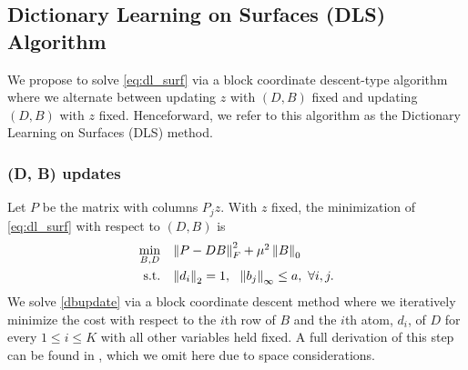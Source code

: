 \subsection{Dictionary Learning on Surfaces (DLS) Algorithm}
We propose to solve \eqref{eq:dl_surf} via a block coordinate descent-type algorithm where we alternate between updating $z$ with $(D,B)$ fixed and updating $(D,B)$ with $z$ fixed. Henceforward, we refer to this algorithm as the Dictionary Learning on Surfaces (DLS) method. 

\subsubsection{(D, B) updates}

Let $P$ be the matrix with columns $P_j z$. With $z$ fixed, the minimization of \eqref{eq:dl_surf} with respect to $(D,B)$ is
\begin{equation}  \label{dbupdate}
\begin{array}{rl}
\displaystyle\min_{B,D} & \left \| P - DB \right \|_F^2 +  \mu^2 \left \| B \right \|_0 \vspace{0.1cm} \\
\text{s.t.} & \left \| d_i \right \|_2 = 1, \ \ \left \| b_j \right \|_{\infty} \leq a, \ \forall i,j.
\end{array}
\end{equation}
We solve \eqref{dbupdate} via a block coordinate descent method where we iteratively minimize the cost with respect to the $i$th row of $B$ and the $i$th atom, $d_i$, of $D$ for every $1 \leq i \leq K$ with all other variables held fixed. A full derivation of this step can be found in \cite{sairajfes2,dinokat2016}, which we omit here due to space considerations.

